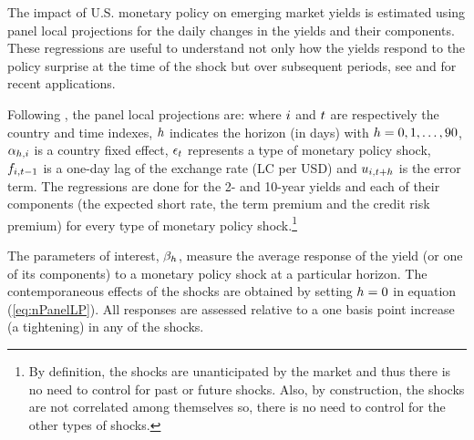{The impact of U.S. monetary policy on emerging market yields is estimated using panel local projections for the daily changes in the yields and their components.
These regressions are useful to understand not only how the yields respond to the policy surprise at the time of the shock but over subsequent periods, see \cite{HofmannShimShin:2019} and \cite{ACDM:2019} for recent applications.

Following \cite{Jorda:2005}, the panel local projections are:
\noindent where \(i\) and \(t\) are respectively the country and time indexes, \(h\) indicates the horizon (in days) with \(h = 0, 1, \ldots, 90\),  \(\alpha_{h,i}\) is a country fixed effect, \(\epsilon_{t}\) represents a type of monetary policy shock, \(f_{i,{t-1}}\) is a one-day lag of the exchange rate (LC per USD) and \(u_{i,{t+h}}\) is the error term.
The regressions are done for the 2- and 10-year yields and each of their components (the expected short rate, the term premium and the credit risk premium) for every type of monetary policy shock.\footnote{ By definition, the shocks are unanticipated by the market and thus there is no need to control for past or future shocks. Also, by construction, the shocks are not correlated among themselves so, there is no need to control for the other types of shocks.}

The parameters of interest, \(\beta_{h}\), measure the average response of the yield (or one of its components) to a monetary policy shock at a particular horizon.
The contemporaneous effects of the shocks are obtained by setting \(h = 0\) in equation (\ref{eq:nPanelLP}).
All responses are assessed relative to a one basis point increase (a tightening) in any of the shocks.


}
